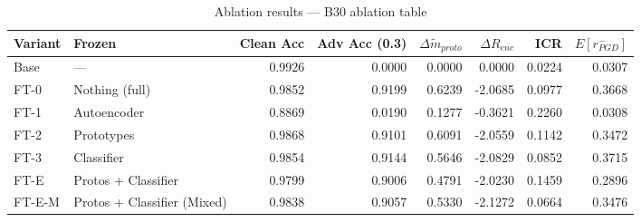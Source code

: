\begin{table}
\caption{Ablation results — B30 ablation table}
\label{tab:B30_ablation_table}
\begin{tabular}{llrrrrrr}
\toprule
Variant & Frozen & Clean Acc & Adv Acc (0.3) & $\Delta\tilde{m}_{proto}$ & $\Delta R_{enc}$ & ICR & $E[r_{PGD}^-]$ \\
\midrule
Base & — & 0.9926 & 0.0000 & 0.0000 & 0.0000 & 0.0224 & 0.0307 \\
FT-0 & Nothing (full) & 0.9852 & 0.9199 & 0.6239 & -2.0685 & 0.0977 & 0.3668 \\
FT-1 & Autoencoder & 0.8869 & 0.0190 & 0.1277 & -0.3621 & 0.2260 & 0.0308 \\
FT-2 & Prototypes & 0.9868 & 0.9101 & 0.6091 & -2.0559 & 0.1142 & 0.3472 \\
FT-3 & Classifier & 0.9854 & 0.9144 & 0.5646 & -2.0829 & 0.0852 & 0.3715 \\
FT-E & Protos + Classifier & 0.9799 & 0.9006 & 0.4791 & -2.0230 & 0.1459 & 0.2896 \\
FT-E-M & Protos + Classifier (Mixed) & 0.9838 & 0.9057 & 0.5330 & -2.1272 & 0.0664 & 0.3476 \\
\bottomrule
\end{tabular}
\end{table}
